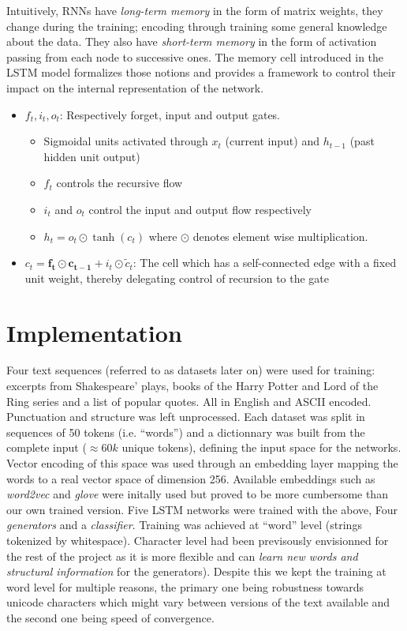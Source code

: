 \documentclass{article}
\begin{document}
Intuitively, RNNs have \textit{long-term memory} in the form of matrix weights,
they change during the training; encoding through training some general
knowledge about the data. They also have \textit{short-term memory} in the form
of activation passing from each node to successive ones. The memory cell
introduced in the LSTM model formalizes those notions and provides a framework
to control their impact on the internal representation of the network.
\begin{center}
    \begin{itemize}
    \item $f_t, i_t, o_t$: Respectively forget, input and output gates.
        \begin{itemize}
            \normalsize
            \item Sigmoidal units activated through  $x_t$ (current input) and
                $h_{t-1}$ (past hidden unit output) \item $f_t$ controls the
                recursive flow
            \item $i_t$ and $o_t$ control the input and output flow
                respectively
            \item $h_t = o_t \odot \tanh(c_t)$ where $\odot$ denotes element
                wise multiplication.
        \end{itemize}
    \item $c_t = \mathbf{f_t \odot c_{t-1}} + i_t \odot \tilde{c}_t$: The cell
    which has a self-connected edge with a fixed unit weight, thereby delegating
    control of recursion to the gate
    \end{itemize}
\end{center}
\section{Implementation}
Four text sequences (referred to as datasets later on) were used for training:
excerpts from Shakespeare' plays, books of the Harry Potter and Lord of the
Ring series and a list of popular quotes.  All in English and ASCII encoded.
Punctuation and structure was left unprocessed.  Each dataset was split in
sequences of 50 tokens (i.e.  ``words'') and a dictionnary was built from the
complete input ($\approx 60k$ unique tokens), defining the input space for the
networks.  Vector encoding of this space was used through an embedding layer
mapping the words to a real vector space of dimension 256.  Available
embeddings such as \textit{word2vec} and \textit{glove} were initally used but
proved to be more cumbersome than our own trained version.  Five LSTM networks
were trained with the above, Four \textit{generators} and a
\textit{classifier}. Training was achieved at ``word'' level (strings tokenized
by whitespace). Character level had been previsously envisionned for the rest
of the project as it is more flexible and can \textit{learn new words and
structural information}\cite{gravesGenerating} for the generators). Despite
this we kept the training at word level for multiple reasons, the primary one
being robustness towards unicode characters which might vary between versions
of the text available and the second one being speed of convergence. 
\end{document}
